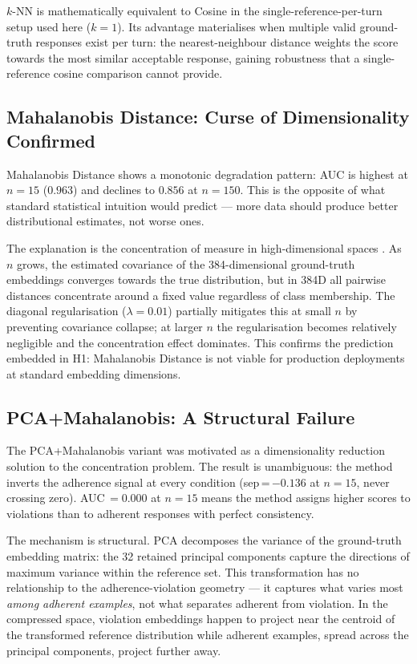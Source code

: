 \documentclass[11pt,a4paper]{article}
\begin{document}
$k$-NN is mathematically equivalent to Cosine in the single-reference-per-turn
setup used here ($k = 1$). Its advantage materialises when multiple valid
ground-truth responses exist per turn: the nearest-neighbour distance weights
the score towards the most similar acceptable response, gaining robustness that
a single-reference cosine comparison cannot provide.

\subsection{Mahalanobis Distance: Curse of Dimensionality Confirmed}

Mahalanobis Distance shows a monotonic degradation pattern: AUC is highest at
$n = 15$ ($0.963$) and declines to $0.856$ at $n = 150$. This is the opposite
of what standard statistical intuition would predict --- more data should
produce better distributional estimates, not worse ones.

The explanation is the concentration of measure in high-dimensional spaces
\citep{beyer1999nearest}. As $n$ grows, the estimated covariance of the
384-dimensional ground-truth embeddings converges towards the true distribution,
but in 384D all pairwise distances concentrate around a fixed value regardless
of class membership. The diagonal regularisation ($\lambda = 0.01$) partially
mitigates this at small $n$ by preventing covariance collapse; at larger $n$
the regularisation becomes relatively negligible and the concentration effect
dominates. This confirms the prediction embedded in H1: Mahalanobis Distance
is not viable for production deployments at standard embedding dimensions.

\subsection{PCA+Mahalanobis: A Structural Failure}

The PCA+Mahalanobis variant was motivated as a dimensionality reduction
solution to the concentration problem. The result is unambiguous: the method
inverts the adherence signal at every condition
(sep\,=\,$-0.136$ at $n = 15$, never crossing zero). AUC\,$= 0.000$ at
$n = 15$ means the method assigns higher scores to violations than to adherent
responses with perfect consistency.

The mechanism is structural. PCA decomposes the variance of the ground-truth
embedding matrix: the 32 retained principal components capture the directions
of maximum variance within the reference set. This transformation has no
relationship to the adherence-violation geometry --- it captures what varies
most \emph{among adherent examples}, not what separates adherent from violation.
In the compressed space, violation embeddings happen to project near the centroid
of the transformed reference distribution while adherent examples, spread across
the principal components, project further away.
\end{document}
